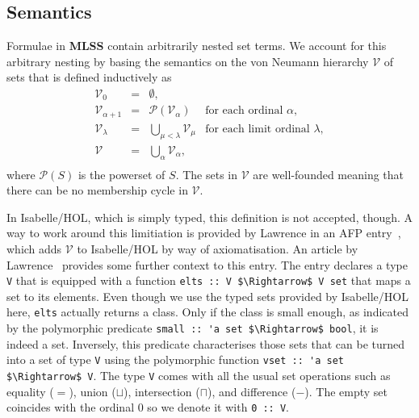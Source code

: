 \documentclass[sigplan,10pt,anonymous,review]{acmart}
\begin{document}
\subsection{Semantics}
Formulae in \textbf{MLSS} contain arbitrarily nested set terms.
We account for this arbitrary nesting by basing the semantics on the von Neumann hierarchy $\mathcal{V}$ of sets that is defined inductively as
  \[
    \begin{array}{rclr}
      \mathcal{V}_0 & = & \emptyset, \\
      \mathcal{V}_{\alpha + 1} & = & \mathcal{P}(\mathcal{V}_\alpha) & \text{for each ordinal $\alpha$}, \\
      \mathcal{V}_{\lambda} & = & \bigcup_{\mu < \lambda} \mathcal{V}_\mu & \text{for each limit ordinal $\lambda$}, \\
      \mathcal{V} & = & \bigcup_\alpha \mathcal{V}_\alpha, \\
    \end{array}
  \]
where $\mathcal{P}(S)$ is the powerset of $S$.
The sets in $\mathcal{V}$ are well-founded meaning that there can be no membership cycle in $\mathcal{V}$.

In Isabelle/HOL, which is simply typed, this definition is not accepted, though.
A way to work around this limitiation is provided by Lawrence in an AFP entry~\cite{zfc_in_hol_afp}, which adds $\mathcal{V}$ to Isabelle/HOL by way of axiomatisation.
An article by Lawrence~\cite{zfc_in_hol} provides some further context to this entry.
The entry declares a type \lstinline!V! that is equipped with a function \lstinline!elts :: V $\Rightarrow$ V set! that maps a set to its elements.
Even though we use the typed sets provided by Isabelle/HOL here, \lstinline!elts! actually returns a class.
Only if the class is small enough, as indicated by the polymorphic predicate \lstinline!small :: 'a set $\Rightarrow$ bool!, it is indeed a set.
Inversely, this predicate characterises those sets that can be turned into a set of type \lstinline!V! using the polymorphic function \lstinline!vset :: 'a set $\Rightarrow$ V!.
The type \lstinline!V! comes with all the usual set operations such as equality ($=$), union ($\sqcup$), intersection ($\sqcap$), and difference ($-$).
The empty set coincides with the ordinal $0$ so we denote it with \lstinline!0 :: V!.
\end{document}
